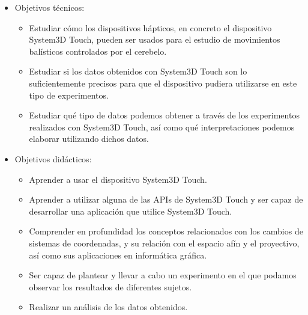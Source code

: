 \documentclass[a4paper,11pt, oneside]{book}
\begin{document}
\begin{itemize}
	\item Objetivos técnicos:
	\begin{itemize}
	\item Estudiar cómo los dispositivos hápticos, en concreto el dispositivo System3D Touch, pueden ser usados para el estudio de movimientos balísticos controlados por el cerebelo.
	
	\item Estudiar si los datos obtenidos con System3D Touch son lo suficientemente precisos para que el dispositivo pudiera utilizarse en este tipo de experimentos.
	
	\item Estudiar qué tipo de datos podemos obtener a través de los experimentos realizados con System3D Touch, así como qué interpretaciones podemos elaborar utilizando dichos datos.

	\end{itemize}
	\item Objetivos didácticos:
	\begin{itemize}
		\item Aprender a usar el dispositivo System3D Touch.
		\item Aprender a utilizar alguna de las APIs de System3D Touch y ser capaz de desarrollar una aplicación que utilice System3D Touch.
		\item Comprender en profundidad los conceptos relacionados con los cambios de sistemas de coordenadas, y su relación con el espacio afín y el proyectivo, así como sus aplicaciones en informática gráfica. 
		\item Ser capaz de plantear y llevar a cabo un experimento en el que podamos observar los resultados de diferentes sujetos.
		\item Realizar un análisis de los datos obtenidos.

	\end{itemize}
\end{itemize}
\end{document}

